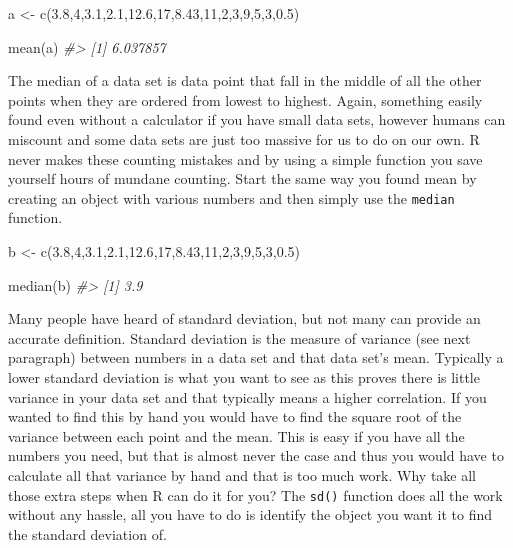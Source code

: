\documentclass[
]{book}
\newenvironment{Shaded}{\begin{snugshade}}{\end{snugshade}}
\newcommand{\CommentTok}[1]{\textcolor[rgb]{0.56,0.35,0.01}{\textit{#1}}}
\newcommand{\DecValTok}[1]{\textcolor[rgb]{0.00,0.00,0.81}{#1}}
\newcommand{\FloatTok}[1]{\textcolor[rgb]{0.00,0.00,0.81}{#1}}
\newcommand{\FunctionTok}[1]{\textcolor[rgb]{0.00,0.00,0.00}{#1}}
\newcommand{\NormalTok}[1]{#1}
\newcommand{\OtherTok}[1]{\textcolor[rgb]{0.56,0.35,0.01}{#1}}
\begin{document}
\begin{Shaded}
\begin{Highlighting}[]
\NormalTok{a }\OtherTok{\textless{}{-}} \FunctionTok{c}\NormalTok{(}\FloatTok{3.8}\NormalTok{,}\DecValTok{4}\NormalTok{,}\FloatTok{3.1}\NormalTok{,}\FloatTok{2.1}\NormalTok{,}\FloatTok{12.6}\NormalTok{,}\DecValTok{17}\NormalTok{,}\FloatTok{8.43}\NormalTok{,}\DecValTok{11}\NormalTok{,}\DecValTok{2}\NormalTok{,}\DecValTok{3}\NormalTok{,}\DecValTok{9}\NormalTok{,}\DecValTok{5}\NormalTok{,}\DecValTok{3}\NormalTok{,}\FloatTok{0.5}\NormalTok{)}

\FunctionTok{mean}\NormalTok{(a)}
\CommentTok{\#\textgreater{} [1] 6.037857}
\end{Highlighting}
\end{Shaded}

The median of a data set is data point that fall in the middle of all the other points when they are ordered from lowest to highest. Again, something easily found even without a calculator if you have small data sets, however humans can miscount and some data sets are just too massive for us to do on our own. R never makes these counting mistakes and by using a simple function you save yourself hours of mundane counting. Start the same way you found mean by creating an object with various numbers and then simply use the \texttt{median} function.

\begin{Shaded}
\begin{Highlighting}[]
\NormalTok{b }\OtherTok{\textless{}{-}} \FunctionTok{c}\NormalTok{(}\FloatTok{3.8}\NormalTok{,}\DecValTok{4}\NormalTok{,}\FloatTok{3.1}\NormalTok{,}\FloatTok{2.1}\NormalTok{,}\FloatTok{12.6}\NormalTok{,}\DecValTok{17}\NormalTok{,}\FloatTok{8.43}\NormalTok{,}\DecValTok{11}\NormalTok{,}\DecValTok{2}\NormalTok{,}\DecValTok{3}\NormalTok{,}\DecValTok{9}\NormalTok{,}\DecValTok{5}\NormalTok{,}\DecValTok{3}\NormalTok{,}\FloatTok{0.5}\NormalTok{)}

\FunctionTok{median}\NormalTok{(b)}
\CommentTok{\#\textgreater{} [1] 3.9}
\end{Highlighting}
\end{Shaded}

Many people have heard of standard deviation, but not many can provide an accurate definition. Standard deviation is the measure of variance (see next paragraph) between numbers in a data set and that data set's mean. Typically a lower standard deviation is what you want to see as this proves there is little variance in your data set and that typically means a higher correlation. If you wanted to find this by hand you would have to find the square root of the variance between each point and the mean. This is easy if you have all the numbers you need, but that is almost never the case and thus you would have to calculate all that variance by hand and that is too much work. Why take all those extra steps when R can do it for you? The \texttt{sd()} function does all the work without any hassle, all you have to do is identify the object you want it to find the standard deviation of.
\end{document}
